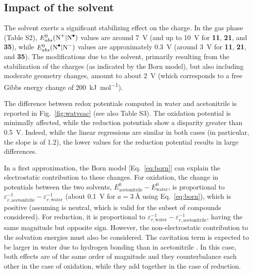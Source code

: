 \documentclass[review,preprint]{elsarticle}
\begin{document}
\clearpage

\subsection{Impact of the solvent} \label{sec:solv}

The solvent exerts a significant stabilizing effect on the charge. In the gas phase (Table S2), $E^0_{abs}(\ce{N+}|\ce{N^.})$ values are around \SI{7}{\volt} (and up to \SI{10}{\volt} for \textbf{11}, \textbf{21}, and \textbf{35}), while $E^0_{abs}(\ce{N^.}|\ce{N-})$ values are approximately \SI{0.3}{\volt} (around \SI{3}{\volt} for \textbf{11}, \textbf{21}, and \textbf{35}). The modifications due to the solvent, primarily resulting from the stabilization of the charges (as indicated by the Born model), but also including moderate geometry changes, amount to about \SI{2}{\volt} (which corresponds to a free Gibbs energy change of \SI{200}{\kilo\joule\per\mole}).

The difference between redox potentials computed in water and acetonitrile is reported in Fig.~\ref{fig:watvsac} (see also Table S3). The oxidation potential is minimally affected, while the reduction potentials show a disparity greater than \SI{0.5}{\volt}. Indeed, while the linear regressions are similar in both cases (in particular, the slope is of 1.2), the lower values for the reduction potential results in large differences.

In a first approximation, the Born model [Eq.~\eqref{eq:born}] can explain the electrostatic contribution to these changes. For oxidation, the change in potentials between the two solvents, $E^0_{\text{acetonitrile}} - E^0_{\text{water}}$, is proportional to $\varepsilon_{r,\text{acetonitrile}}^{-1} - \varepsilon_{r,\text{water}}^{-1}$ (about \SI{0.1}{\volt} for $a = \SI{3}{\angstrom}$ using Eq.~\eqref{eq:born}), which is positive (assuming  is neutral, which is valid for the subset of compounds considered). For reduction, it is proportional to $\varepsilon_{r,\text{water}}^{-1} - \varepsilon_{r,\text{acetonitrile}}^{-1}$, having the same magnitude but opposite sign. However, the non-electrostatic contribution to the solvation energies must also be considered. The cavitation term is expected to be larger in water due to hydrogen bonding than in acetonitrile \cite{marenichUniversalSolvationModel2009}. In this case, both effects are of the same order of magnitude and they counterbalance each other in the case of oxidation, while they add together in the case of reduction.
\end{document}
